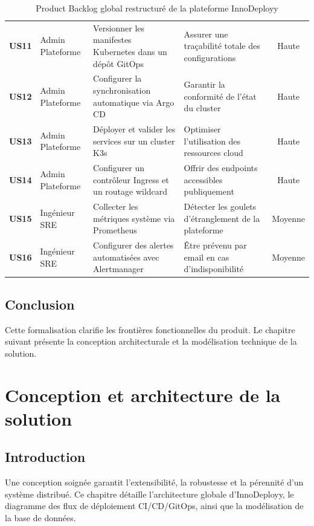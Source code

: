 \documentclass[12pt,a4paper,oneside]{report}
\begin{document}
\begin{table}[H]
\begin{tabularx}{\textwidth}{l p{2.8cm} X X c}
\textbf{US11} & Admin Plateforme & Versionner les manifestes Kubernetes dans un dépôt GitOps & Assurer une traçabilité totale des configurations & Haute \\
\textbf{US12} & Admin Plateforme & Configurer la synchronisation automatique via Argo CD & Garantir la conformité de l'état du cluster & Haute \\
\textbf{US13} & Admin Plateforme & Déployer et valider les services sur un cluster K3s & Optimiser l'utilisation des ressources cloud & Haute \\
\textbf{US14} & Admin Plateforme & Configurer un contrôleur Ingress et un routage wildcard & Offrir des endpoints accessibles publiquement & Haute \\
\textbf{US15} & Ingénieur SRE & Collecter les métriques système via Prometheus & Détecter les goulets d'étranglement de la plateforme & Moyenne \\
\textbf{US16} & Ingénieur SRE & Configurer des alertes automatisées avec Alertmanager & Être prévenu par email en cas d'indisponibilité & Moyenne \\
\bottomrule
\end{tabularx}
\caption{Product Backlog global restructuré de la plateforme InnoDeployy}
\end{table}

\section{Conclusion}
Cette formalisation clarifie les frontières fonctionnelles du produit. Le chapitre suivant présente la conception architecturale et la modélisation technique de la solution.

\clearpage

\chapter{Conception et architecture de la solution}

\section{Introduction}
Une conception soignée garantit l'extensibilité, la robustesse et la pérennité d'un système distribué. Ce chapitre détaille l'architecture globale d'InnoDeployy, le diagramme des flux de déploiement CI/CD/GitOps, ainsi que la modélisation de la base de données.
\end{document}
